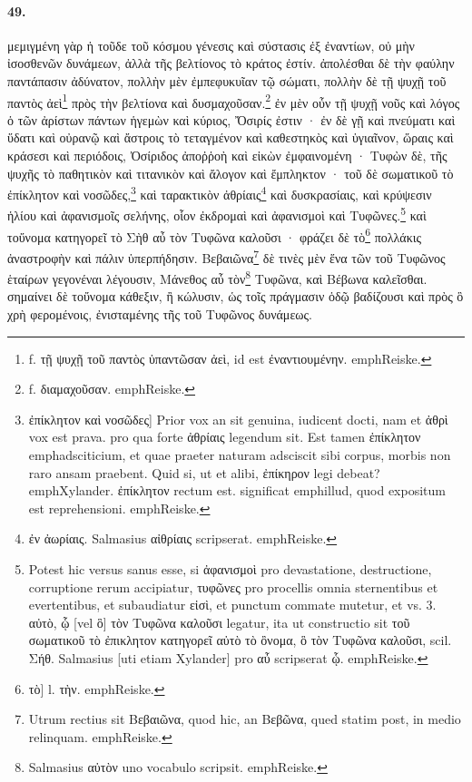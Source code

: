 \documentclass[a4paper, 11pt, oneside, polutonikogreek, german]{article}
\begin{document}
\paragraph{49.}
μεμιγμένη γὰρ ἡ τοῦδε τοῦ κόσμου γένεσις καὶ σύστασις ἐξ ἐναντίων, οὐ μὴν ἰσοσθενῶν δυνάμεων, ἀλλὰ τῆς βελτίονος τὸ κράτος ἐστίν. ἀπολέσθαι δὲ τὴν φαύλην παντάπασιν ἀδύνατον, πολλὴν μὲν ἐμπεφυκυῖαν τῷ σώματι, πολλὴν δὲ τῇ ψυχῇ τοῦ παντὸς ἀεὶ\footnote{f. τῇ ψυχῇ τοῦ παντὸς ὑπαντῶσαν ἀεὶ, id est ἐναντιουμένην. emph{Reiske.}} πρὸς τὴν βελτίονα καὶ δυσμαχοῦσαν.\footnote{f. διαμαχοῦσαν. emph{Reiske.}} ἐν μὲν οὖν τῇ ψυχῇ νοῦς καὶ λόγος ὁ τῶν ἀρίστων πάντων ἡγεμὼν καὶ κύριος, Ὄσιρίς ἐστιν · ἐν δὲ γῇ καὶ πνεύματι καὶ ὕδατι καὶ οὐρανῷ καὶ ἄστροις τὸ τεταγμένον καὶ καθεστηκὸς καὶ ὑγιαῖνον, ὥραις καὶ κράσεσι καὶ περιόδοις, Ὀσίριδος ἀποῤῥοὴ καὶ εἰκὼν ἐμφαινομένη · Τυφὼν δὲ, τῆς ψυχῆς τὸ παθητικὸν καὶ τιτανικὸν καὶ ἄλογον καὶ ἔμπληκτον · τοῦ δὲ σωματικοῦ τὸ ἐπίκλητον καὶ νοσῶδες,\footnote{ἐπίκλητον καὶ νοσῶδες] Prior vox an sit genuina, iudicent docti, nam et ἀθρὶ vox est prava. pro qua forte ἀθρίαις legendum sit. Est tamen ἐπίκλητον emph{adsciticium}, et quae praeter naturam adsciscit sibi corpus, morbis non raro ansam praebent. Quid si, ut et alibi, ἐπίκηρον legi debeat? emph{Xylander.} ἐπίκλητον rectum est. significat emph{illud, quod expositum est reprehensioni.} emph{Reiske.}} καὶ ταρακτικὸν ἀθρίαις\footnote{ἐν ἀωρίαις. Salmasius αἰθρίαις scripserat. emph{Reiske.} } καὶ δυσκρασίαις, καὶ κρύψεσιν ἡλίου καὶ ἀφανισμοῖς σελήνης, οἷον ἐκδρομαὶ καὶ ἀφανισμοὶ καὶ Τυφῶνες.\footnote{Potest hic versus sanus esse, si ἀφανισμοὶ pro devastatione, destructione, corruptione rerum accipiatur, τυφῶνες pro procellis omnia sternentibus et evertentibus, et subaudiatur εἰσὶ, et punctum commate mutetur, et vs. 3. αὐτὸ, ᾧ [vel ὃ] τὸν Τυφῶνα καλοῦσι legatur, ita ut constructio sit τοῦ σωματικοῦ τὸ ἐπικλητον κατηγορεῖ αὐτὸ τὸ ὂνομα, ὃ τὸν Τυφῶνα καλοῦσι, scil. Σήθ. Salmasius [uti etiam Xylander] pro αὖ scripserat ᾧ. emph{Reiske.}} καὶ τοὔνομα κατηγορεῖ τὸ Σὴθ αὖ τὸν Τυφῶνα καλοῦσι · φράζει δὲ τὸ\footnote{τὸ] l. τὴν. emph{Reiske.}} πολλάκις ἀναστροφὴν καὶ πάλιν ὑπερπήδησιν. Βεβαιῶνα\footnote{Utrum rectius sit Βεβαιῶνα, quod hic, an Βεβῶνα, qued statim post, in medio relinquam. emph{Reiske.}} δὲ τινὲς μὲν ἕνα τῶν τοῦ Τυφῶνος ἑταίρων γεγονέναι λέγουσιν, Μάνεθος αὖ τὸν\footnote{Salmasius αὐτὸν uno vocabulo scripsit. emph{Reiske.}} Τυφῶνα, καὶ Βέβωνα καλεῖσθαι. σημαίνει δὲ τοὔνομα κάθεξιν, ἢ κώλυσιν, ὡς τοῖς πράγμασιν ὁδῷ βαδίζουσι καὶ πρὸς ὃ χρὴ φερομένοις, ἐνισταμένης τῆς τοῦ Τυφῶνος δυνάμεως.
\end{document}
